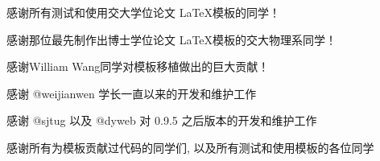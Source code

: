 \begin{thanks}

  感谢所有测试和使用交大学位论文 \LaTeX 模板的同学！

  感谢那位最先制作出博士学位论文 \LaTeX 模板的交大物理系同学！

  感谢William Wang同学对模板移植做出的巨大贡献！
  
  感谢 @weijianwen 学长一直以来的开发和维护工作
  
  感谢 @sjtug 以及 @dyweb 对 0.9.5 之后版本的开发和维护工作
  
  感谢所有为模板贡献过代码的同学们, 以及所有测试和使用模板的各位同学

\end{thanks}
